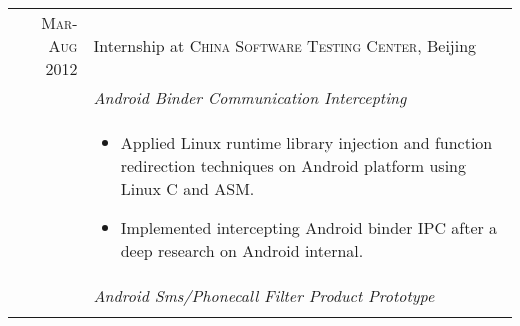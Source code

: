 \documentclass[a4paper,10pt]{article} %
\begin{document}
\begin{tabular}{r|p{11cm}}



\textsc{Mar-Aug 2012} & Internship at \textsc{China Software Testing Center}, Beijing \emph{}\smallskip\\
& \emph{Android Binder Communication Intercepting}\\
& \footnotesize{
\begin{itemize}
\item Applied Linux runtime library injection and function redirection techniques on Android platform using Linux C and ASM. 
\item Implemented intercepting Android binder IPC after a deep research on Android internal. 
\end{itemize}
}\\
& \emph{Android Sms/Phonecall Filter Product Prototype}\\
\multicolumn{2}{c}{} \\
\end{tabular}
\pagebreak
\end{document}
